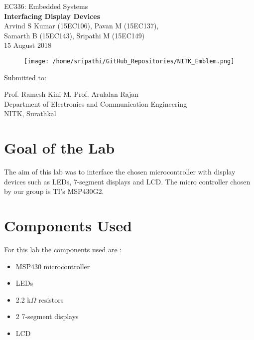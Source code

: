 \documentclass[12pt, letterpaper]{article}
\begin{document}
\begin{titlepage}

\begin{center}
	\large{EC336: Embedded Systems}\\
	\huge{\textbf{Interfacing Display Devices}}\\
	\large{Arvind S Kumar (15EC106), Pavan M (15EC137),\\ Samarth B (15EC143), Sripathi M (15EC149)}\\
	\large{15 August 2018}
\end{center}	

\begin{figure}[!h]
	\centering
	\texttt{[image: /home/sripathi/GitHub\_Repositories/NITK\_Emblem.png]}
	\label{fig:NITKEmblem}
\end{figure}	
\begin{center}
	
\huge{Submitted to:}\\
\begin{large}
Prof. Ramesh Kini M, Prof. Arulalan Rajan\\
Department of Electronics and Communication Engineering\\
NITK, Surathkal
\end{large}

\end{center}

\end{titlepage}

\section{Goal of the Lab}

The aim of this lab was to interface the chosen microcontroller with display devices such as LEDs, 7-segment displays and LCD. The micro controller chosen by our group is TI's MSP430G2.

\section{Components Used}

For this lab the components used are :

\begin{itemize}
	\item MSP430 microcontroller
	\item LEDs
	\item 2.2 k$\Omega$ resistors
	\item 2 7-segment displays
	\item LCD
\end{itemize}
\end{document}
